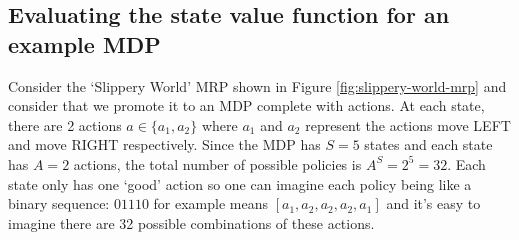 \documentclass[a4paper,11pt]{article}
\begin{document}
\subsection{Evaluating the state value function for an example MDP}

Consider the `Slippery World' MRP shown in Figure \ref{fig:slippery-world-mrp} and consider that we promote it to an MDP complete with actions.  At each state, there are 2 actions $a \in \{a_1, a_2\}$ where $a_1$ and $a_2$ represent the actions move LEFT and move RIGHT respectively.  Since the MDP has $S = 5$ states and each state has $A = 2$ actions, the total number of possible policies is $A^S = 2^5 = 32$.  Each state only has one `good' action so one can imagine each policy being like a binary sequence: $01110$ for example means $[a_1,a_2,a_2,a_2,a_1]$ and it's easy to imagine there are 32 possible combinations of these actions.
\end{document}
